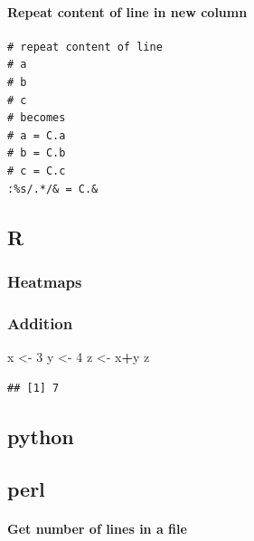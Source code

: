 \documentclass[openany]{article}
\newenvironment{Shaded}{\begin{snugshade}}{\end{snugshade}}
\newcommand{\DecValTok}[1]{\textcolor[rgb]{0.00,0.00,0.81}{#1}}
\newcommand{\NormalTok}[1]{#1}
\newcommand{\OperatorTok}[1]{\textcolor[rgb]{0.81,0.36,0.00}{\textbf{#1}}}
\newcommand{\StringTok}[1]{\textcolor[rgb]{0.31,0.60,0.02}{#1}}
\let\oldparagraph\paragraph
\renewcommand{\paragraph}[1]{\oldparagraph{#1}\mbox{}}
\begin{document}
\hypertarget{repeat-content-of-line-in-new-column}{%
\paragraph{Repeat content of line in new column}\label{repeat-content-of-line-in-new-column}}

\begin{verbatim}
# repeat content of line
# a
# b
# c
# becomes
# a = C.a
# b = C.b
# c = C.c
:%s/.*/& = C.&
\end{verbatim}

\hypertarget{r-1}{%
\subsection{R}\label{r-1}}

\hypertarget{heatmaps}{%
\subsubsection{Heatmaps}\label{heatmaps}}

\hypertarget{addition}{%
\subsubsection{Addition}\label{addition}}

\begin{Shaded}
\begin{Highlighting}[]
\NormalTok{x <-}\StringTok{ }\DecValTok{3}
\NormalTok{y <-}\StringTok{ }\DecValTok{4}
\NormalTok{z <-}\StringTok{ }\NormalTok{x}\OperatorTok{+}\NormalTok{y}
\NormalTok{z}
\end{Highlighting}
\end{Shaded}

\begin{verbatim}
## [1] 7
\end{verbatim}

\hypertarget{python}{%
\subsection{python}\label{python}}

\hypertarget{perl}{%
\subsection{perl}\label{perl}}

\hypertarget{get-number-of-lines-in-a-file}{%
\paragraph{Get number of lines in a file}\label{get-number-of-lines-in-a-file}}
\end{document}

